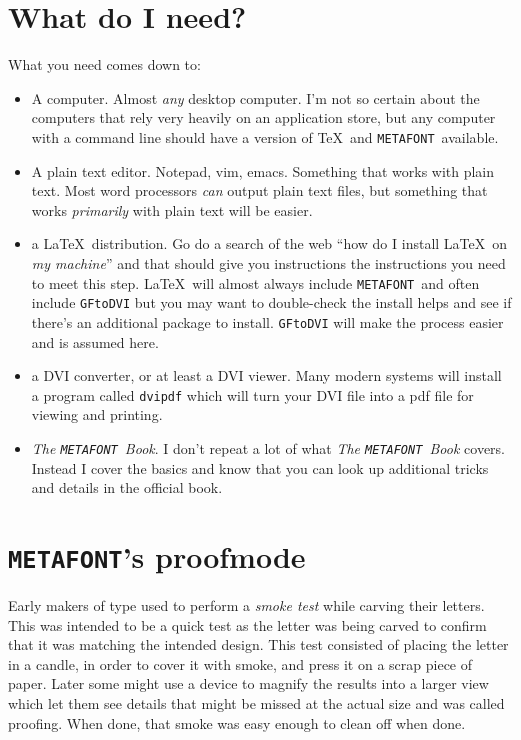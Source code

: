 \documentclass[a4paper,11pt,twoside]{book}
\newcommand{\MF}{{\tt METAFONT}}
\begin{document}
\section{What do I need?}

What you need comes down to:
\begin{itemize}
\item A computer.
Almost \emph{any} desktop computer.
I'm not so certain about the computers that rely very heavily on an application store, but any
computer with a command line should have a version of \TeX\ and \MF\ available.
\item A plain text editor.
Notepad, vim, emacs.
Something that works with plain text.
Most word processors \emph{can} output plain text files, but something that works \emph{primarily}
with plain text will be easier.
\item a \LaTeX\ distribution.
Go do a search of the web ``how do I install \LaTeX\ on \emph{my machine}'' and that should give
you instructions the instructions you need to meet this step.
\LaTeX\ will almost always include \MF\ and often include \texttt{GFtoDVI} but you may want to
double-check the install helps and see if there's an additional package to install.
\texttt{GFtoDVI} will make the process easier and is assumed here.
\item a DVI converter, or at least a DVI viewer.
Many modern systems will install a program called \texttt{dvipdf} which will turn your DVI file
into a pdf file for viewing and printing.
\item \textsl{The \MF\ Book}.
I don't repeat a lot of what \textsl{The \MF\ Book} covers.
Instead I cover the basics and know that you can look up additional tricks and details in the
official book.
\end{itemize}

\section{\MF's proofmode}

Early makers of type used to perform a \emph{smoke test} while carving their letters.
This was intended to be a quick test as the letter was being carved to confirm that it was
matching the intended design.
This test consisted of placing the letter in a candle, in order to cover it with smoke, and press
it on a scrap piece of paper.
Later some might use a device to magnify the results into a larger view which let them see details
that might be missed at the actual size and was called proofing.
When done, that smoke was easy enough to clean off when done.
\end{document}
